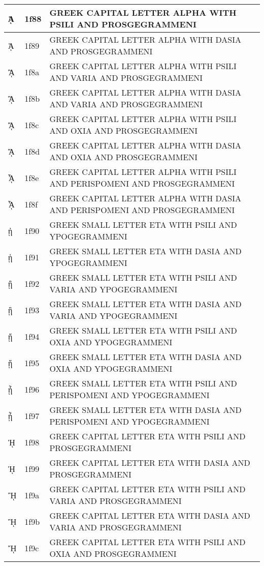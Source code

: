 \documentclass[12pt,letterpaper,openany]{book}
\begin{document}
\begin{center}
\begin{supertabular}{|m{0.25in}|m{0.5in}|m{4in}|}
			ᾈ & 1f88 & GREEK CAPITAL LETTER ALPHA WITH PSILI AND PROSGEGRAMMENI\\\hline
			ᾉ & 1f89 & GREEK CAPITAL LETTER ALPHA WITH DASIA AND PROSGEGRAMMENI\\\hline
			ᾊ & 1f8a & GREEK CAPITAL LETTER ALPHA WITH PSILI AND VARIA AND PROSGEGRAMMENI\\\hline
			ᾋ & 1f8b & GREEK CAPITAL LETTER ALPHA WITH DASIA AND VARIA AND PROSGEGRAMMENI\\\hline
			ᾌ & 1f8c & GREEK CAPITAL LETTER ALPHA WITH PSILI AND OXIA AND PROSGEGRAMMENI\\\hline
			ᾍ & 1f8d & GREEK CAPITAL LETTER ALPHA WITH DASIA AND OXIA AND PROSGEGRAMMENI\\\hline
			ᾎ & 1f8e & GREEK CAPITAL LETTER ALPHA WITH PSILI AND PERISPOMENI AND PROSGEGRAMMENI\\\hline
			ᾏ & 1f8f & GREEK CAPITAL LETTER ALPHA WITH DASIA AND PERISPOMENI AND PROSGEGRAMMENI\\\hline
			ᾐ & 1f90 & GREEK SMALL LETTER ETA WITH PSILI AND YPOGEGRAMMENI\\\hline
			ᾑ & 1f91 & GREEK SMALL LETTER ETA WITH DASIA AND YPOGEGRAMMENI\\\hline
			ᾒ & 1f92 & GREEK SMALL LETTER ETA WITH PSILI AND VARIA AND YPOGEGRAMMENI\\\hline
			ᾓ & 1f93 & GREEK SMALL LETTER ETA WITH DASIA AND VARIA AND YPOGEGRAMMENI\\\hline
			ᾔ & 1f94 & GREEK SMALL LETTER ETA WITH PSILI AND OXIA AND YPOGEGRAMMENI\\\hline
			ᾕ & 1f95 & GREEK SMALL LETTER ETA WITH DASIA AND OXIA AND YPOGEGRAMMENI\\\hline
			ᾖ & 1f96 & GREEK SMALL LETTER ETA WITH PSILI AND PERISPOMENI AND YPOGEGRAMMENI\\\hline
			ᾗ & 1f97 & GREEK SMALL LETTER ETA WITH DASIA AND PERISPOMENI AND YPOGEGRAMMENI\\\hline
			ᾘ & 1f98 & GREEK CAPITAL LETTER ETA WITH PSILI AND PROSGEGRAMMENI\\\hline
			ᾙ & 1f99 & GREEK CAPITAL LETTER ETA WITH DASIA AND PROSGEGRAMMENI\\\hline
			ᾚ & 1f9a & GREEK CAPITAL LETTER ETA WITH PSILI AND VARIA AND PROSGEGRAMMENI\\\hline
			ᾛ & 1f9b & GREEK CAPITAL LETTER ETA WITH DASIA AND VARIA AND PROSGEGRAMMENI\\\hline
			ᾜ & 1f9c & GREEK CAPITAL LETTER ETA WITH PSILI AND OXIA AND PROSGEGRAMMENI\\\hline

\end{supertabular}
\end{center}
\end{document}
